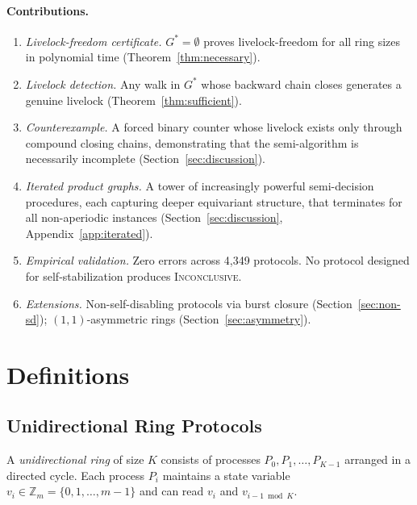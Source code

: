 \documentclass[11pt]{article}
\begin{document}
\paragraph{Contributions.}
\begin{enumerate}[nosep]
\item \emph{Livelock-freedom certificate.} $G^* = \emptyset$ proves livelock-freedom for all ring sizes in polynomial time (Theorem~\ref{thm:necessary}).

\item \emph{Livelock detection.} Any walk in $G^*$ whose backward chain closes generates a genuine livelock (Theorem~\ref{thm:sufficient}).

\item \emph{Counterexample.} A forced binary counter whose livelock exists only through compound closing chains, demonstrating that the semi-algorithm is necessarily incomplete (Section~\ref{sec:discussion}).

\item \emph{Iterated product graphs.} A tower of increasingly powerful semi-decision procedures, each capturing deeper equivariant structure, that terminates for all non-aperiodic instances (Section~\ref{sec:discussion}, Appendix~\ref{app:iterated}).

\item \emph{Empirical validation.} Zero errors across 4{,}349 protocols. No protocol designed for self-stabilization produces \textsc{Inconclusive}.

\item \emph{Extensions.} Non-self-disabling protocols via burst closure (Section~\ref{sec:non-sd}); $(1,1)$-asymmetric rings (Section~\ref{sec:asymmetry}).
\end{enumerate}

\section{Definitions}
\label{sec:defs}

\subsection{Unidirectional Ring Protocols}

A \emph{unidirectional ring} of size $K$ consists of processes $P_0, P_1, \ldots, P_{K-1}$ arranged in a directed cycle. Each process $P_i$ maintains a state variable $v_i \in \mathbb{Z}_m = \{0, 1, \ldots, m-1\}$ and can read $v_i$ and $v_{i-1 \bmod K}$.
\end{document}
